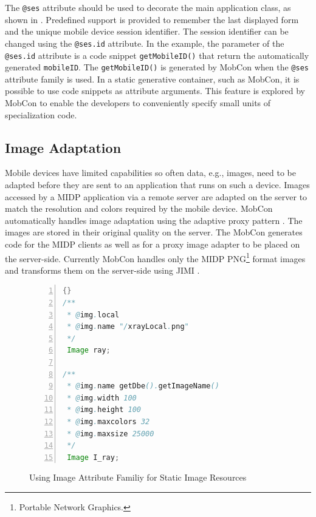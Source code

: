The \texttt{@ses} attribute should be used to decorate the main application class, as shown in . Predefined support is provided to remember the last displayed form and the unique mobile device session identifier. The session identifier can be changed using the \texttt{@ses.id} attribute. In the example, the parameter of the \texttt{@ses.id} attribute is a code snippet \texttt{get\-Mo\-bi\-le\-ID()} that return the automatically generated \texttt{mo\-bi\-le\-ID}. The \texttt{get\-Mo\-bi\-le\-ID()} is generated by MobCon when the \texttt{@ses} attribute family is used. In a static generative container, such as MobCon, it is possible to use code snippets as attribute arguments. This feature is explored by MobCon to enable the developers to conveniently specify small units of specialization code. 


\subsection{Image Adaptation}
\label{sec.img.adapt}

Mobile devices have limited capabilities so often data, e.g., images, need to be adapted before they are sent to an application that runs on such a device. Images accessed by a MIDP application via a remote server are adapted on the server to match the resolution and colors required by the mobile device. MobCon automatically handles image adaptation using the adaptive proxy pattern \cite{fox98adapting}. The images are stored in their original quality on the server. The MobCon generates code for the MIDP clients as well as for a proxy image adapter to be placed on the server-side. Currently MobCon handles only the MIDP PNG\footnote{Portable Network Graphics.} format images and transforms them on the server-side using JIMI \cite{www.jimi}.

\begin{figure}[ht]
	\begin{center}
		\begin{minipage}[t]{5cm}
		\begin{scriptsize}
\begin{lstlisting}[numbers=left,language=Java,frame=leftline]{}
/**
 * @img.local
 * @img.name "/xrayLocal.png"
 */
 Image ray;
  
/**
 * @img.name getDbe().getImageName()
 * @img.width 100
 * @img.height 100
 * @img.maxcolors 32
 * @img.maxsize 25000
 */
 Image I_ray;
\end{lstlisting}
		\end{scriptsize}
			\end{minipage}
	\end{center}
	\caption{Using Image Attribute Familiy for Static Image Resources}
\label{fig:mob.img}
\end{figure}

